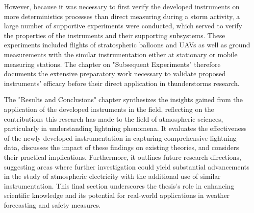 However, because it was necessary to first verify the developed instruments on more deterministics processes than direct measuring during a storm activity, a large number of supportive experiments were conducted, which served to verify the properties of the instruments and their supporting subsystems. These experiments included flights of stratospheric balloons and UAVs as well as ground measurements with the similar instrumentation either at stationary or mobile measuring stations. The chapter on "Subsequent Experiments" therefore documents the extensive preparatory work necessary to validate proposed instruments' efficacy before their direct application in thunderstorms research.

The "Results and Conclusions" chapter synthesizes the insights gained from the application of  the developed instruments in the field, reflecting on the contributions this research has made to the field of atmospheric sciences, particularly in understanding lightning phenomena. It evaluates the effectiveness of the newly developed instrumentation in capturing comprehensive lightning data, discusses the impact of these findings on existing theories, and considers their practical implications. Furthermore, it outlines future research directions, suggesting areas where further investigation could yield substantial advancements in the study of atmospheric electricity with the additional use of similar instrumentation. This final section underscores the thesis's role in enhancing scientific knowledge and its potential for real-world applications in weather forecasting and safety measures.
